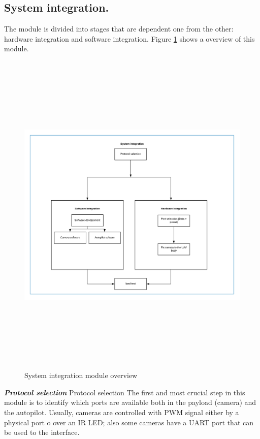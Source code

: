 \subsection{System integration.}
The module is divided into stages that are dependent one from the other: hardware integration and software integration. Figure \ref{fig:Systemintegration} shows a overview of this module.
\begin{figure}[H]
\centering
\includegraphics[width=16cm,height=16cm,keepaspectratio]{imagenes/Systemintegration.png}
\caption{System integration module overview}
\label{fig:Systemintegration}
\end{figure}
\textit{\textbf{Protocol selection}}\newline
Protocol selection
The first and most crucial step in this module is to identify which ports are available both in the payload (camera) and the autopilot. Usually,  cameras are controlled with PWM signal either by a physical port o over an IR LED; also some cameras have a UART port that can be used to the interface. 

